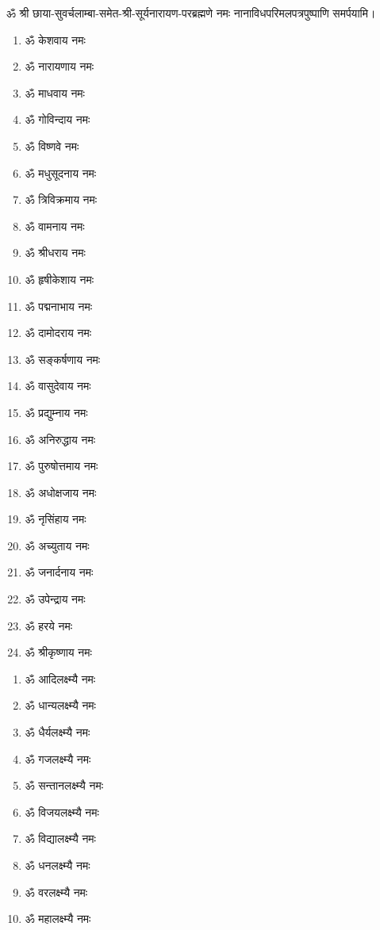 \begin{center}
\begin{multicols}{2}
\begin{enumerate}
\end{enumerate}
\end{multicols}
ॐ श्री छाया-सुवर्चलाम्बा-समेत-श्री-सूर्यनारायण-परब्रह्मणे नमः नानाविधपरिमलपत्रपुष्पाणि समर्पयामि। \medskip


\begin{multicols}{2}
\begin{enumerate}
\item ॐ केशवाय नमः
\item ॐ नारायणाय नमः
\item ॐ माधवाय नमः
\item ॐ गोविन्दाय नमः
\item ॐ विष्णवे नमः	
\item ॐ मधुसूदनाय नमः
\item ॐ त्रिविक्रमाय नमः
\item ॐ वामनाय नमः
\item ॐ श्रीधराय नमः
\item ॐ हृषीकेशाय नमः
\item ॐ पद्मनाभाय नमः
\item ॐ दामोदराय नमः
\item ॐ सङ्कर्षणाय नमः
\item ॐ वासुदेवाय नमः
\item ॐ प्रद्युम्नाय नमः
\item ॐ अनिरुद्धाय नमः
\item ॐ पुरुषोत्तमाय नमः
\item ॐ अधोक्षजाय नमः
\item ॐ नृसिंहाय नमः
\item ॐ अच्युताय नमः
\item ॐ जनार्दनाय नमः
\item ॐ उपेन्द्राय नमः 
\item ॐ हरये नमः
\item ॐ श्रीकृष्णाय नमः
\end{enumerate}
\end{multicols}


\begin{multicols}{2}
\begin{enumerate}
\item ॐ आदिलक्ष्म्यै नमः
\item ॐ धान्यलक्ष्म्यै नमः
\item ॐ धैर्यलक्ष्म्यै नमः
\item ॐ गजलक्ष्म्यै नमः
\item ॐ सन्तानलक्ष्म्यै नमः
\item ॐ विजयलक्ष्म्यै नमः
\item ॐ विद्यालक्ष्म्यै नमः
\item ॐ धनलक्ष्म्यै नमः
\item ॐ वरलक्ष्म्यै नमः
\item ॐ महालक्ष्म्यै नमः 
\end{enumerate}
\end{multicols}


\end{center}
